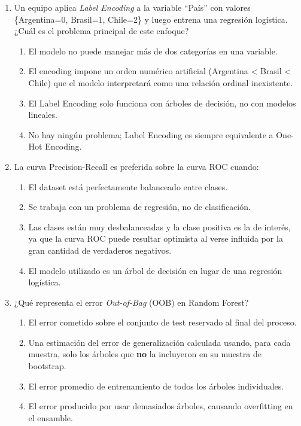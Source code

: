 \documentclass[11pt,a4paper]{article}
\begin{document}
\begin{enumerate}[label=\textbf{\arabic*.}, leftmargin=*, itemsep=20pt]
\item Un equipo aplica \textit{Label Encoding} a la variable ``Pa\'is'' con valores \{Argentina=0, Brasil=1, Chile=2\} y luego entrena una regresi\'on log\'istica. ¿Cu\'al es el problema principal de este enfoque?

\begin{enumerate}[label=\alph*)]
  \item El modelo no puede manejar m\'as de dos categor\'ias en una variable.
  \item El encoding impone un orden num\'erico artificial (Argentina < Brasil < Chile) que el modelo interpretar\'a como una relaci\'on ordinal inexistente.
  \item El Label Encoding solo funciona con \'arboles de decisi\'on, no con modelos lineales.
  \item No hay ning\'un problema; Label Encoding es siempre equivalente a One-Hot Encoding.
\end{enumerate}

\item La curva Precision-Recall es preferida sobre la curva ROC cuando:

\begin{enumerate}[label=\alph*)]
  \item El dataset est\'a perfectamente balanceado entre clases.
  \item Se trabaja con un problema de regresi\'on, no de clasificaci\'on.
  \item Las clases est\'an muy desbalanceadas y la clase positiva es la de inter\'es, ya que la curva ROC puede resultar optimista al verse influida por la gran cantidad de verdaderos negativos.
  \item El modelo utilizado es un \'arbol de decisi\'on en lugar de una regresi\'on log\'istica.
\end{enumerate}

\item ¿Qu\'e representa el error \textit{Out-of-Bag} (OOB) en Random Forest?

\begin{enumerate}[label=\alph*)]
  \item El error cometido sobre el conjunto de test reservado al final del proceso.
  \item Una estimaci\'on del error de generalizaci\'on calculada usando, para cada muestra, solo los \'arboles que \textbf{no} la incluyeron en su muestra de bootstrap.
  \item El error promedio de entrenamiento de todos los \'arboles individuales.
  \item El error producido por usar demasiados \'arboles, causando overfitting en el ensamble.
\end{enumerate}


\end{enumerate}
\end{document}
